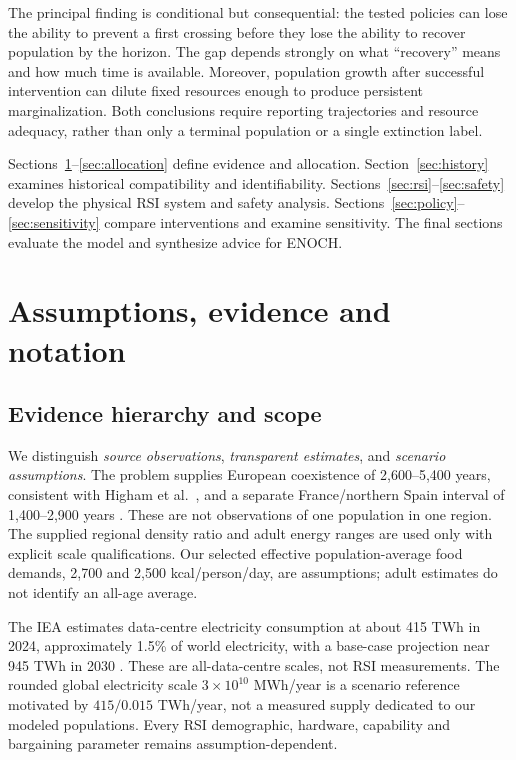 \documentclass[12pt,a4paper]{article}
\theoremstyle{remark}
\begin{document}
The principal finding is conditional but consequential: the tested policies can lose the ability to prevent a first crossing before they lose the ability to recover population by the horizon. The gap depends strongly on what ``recovery'' means and how much time is available. Moreover, population growth after successful intervention can dilute fixed resources enough to produce persistent marginalization. Both conclusions require reporting trajectories and resource adequacy, rather than only a terminal population or a single extinction label.

Sections~\ref{sec:assumptions}--\ref{sec:allocation} define evidence and allocation. Section~\ref{sec:history} examines historical compatibility and identifiability. Sections~\ref{sec:rsi}--\ref{sec:safety} develop the physical RSI system and safety analysis. Sections~\ref{sec:policy}--\ref{sec:sensitivity} compare interventions and examine sensitivity. The final sections evaluate the model and synthesize advice for ENOCH.

\section{Assumptions, evidence and notation}\label{sec:assumptions}
\subsection{Evidence hierarchy and scope}
We distinguish \emph{source observations}, \emph{transparent estimates}, and \emph{scenario assumptions}. The problem supplies European coexistence of 2,600--5,400 years, consistent with Higham et al.\ \cite{higham}, and a separate France/northern Spain interval of 1,400--2,900 years \cite{djakovic}. These are not observations of one population in one region. The supplied regional density ratio and adult energy ranges are used only with explicit scale qualifications. Our selected effective population-average food demands, 2,700 and 2,500 kcal/person/day, are assumptions; adult estimates do not identify an all-age average.

The IEA estimates data-centre electricity consumption at about 415 TWh in 2024, approximately 1.5\% of world electricity, with a base-case projection near 945 TWh in 2030 \cite{iea}. These are all-data-centre scales, not RSI measurements. The rounded global electricity scale $3\times10^{10}$ MWh/year is a scenario reference motivated by $415/0.015$ TWh/year, not a measured supply dedicated to our modeled populations. Every RSI demographic, hardware, capability and bargaining parameter remains assumption-dependent.
\end{document}
